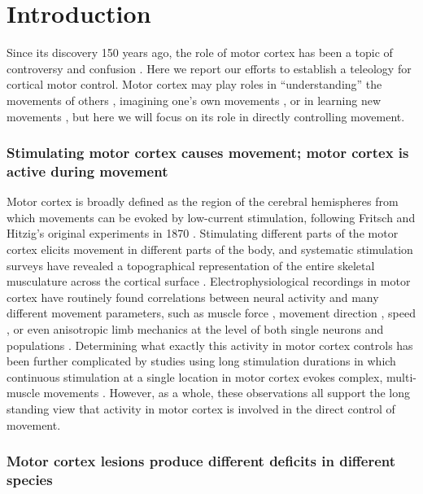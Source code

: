 \section{Introduction}

Since its discovery 150 years ago, the role of motor cortex has been a topic of controversy and confusion \cite{Tyler2000,Gross2007,Lashley1924,DeBarenne1933}. Here we report our efforts to establish a teleology for cortical motor control. Motor cortex may play roles in ``understanding'' the movements of others \cite{Rizzolatti2004}, imagining one's own movements \cite{Porro1996}, or in learning new movements \cite{Kawai2015}, but here we will focus on its role in directly controlling movement.

\subsubsection*{Stimulating motor cortex causes movement; motor cortex is active during movement}

Motor cortex is broadly defined as the region of the cerebral hemispheres from which movements can be evoked by low-current stimulation, following Fritsch and Hitzig's original experiments in 1870 \cite{Fritsch1870}. Stimulating different parts of the motor cortex elicits movement in different parts of the body, and systematic stimulation surveys have revealed a topographical representation of the entire skeletal musculature across the cortical surface \cite{Leyton1917, Penfield1937, Neafsey1986}. Electrophysiological recordings in motor cortex have routinely found correlations between neural activity and many different movement parameters, such as muscle force \cite{Evarts1968}, movement direction \cite{Georgopoulos1986}, speed \cite{Schwartz1993}, or even anisotropic limb mechanics \cite{Scott2001} at the level of both single neurons \cite{Evarts1968,Churchland2007} and populations \cite{Georgopoulos1986,Churchland2012}. Determining what exactly this activity in motor cortex controls \cite{Todorov2000} has been further complicated by studies using long stimulation durations in which continuous stimulation at a single location in motor cortex evokes complex, multi-muscle movements \cite{Graziano2002,Aflalo2006}. However, as a whole, these observations all support the long standing view that activity in motor cortex is involved in the direct control of movement.

\subsubsection*{Motor cortex lesions produce different deficits in different species}

